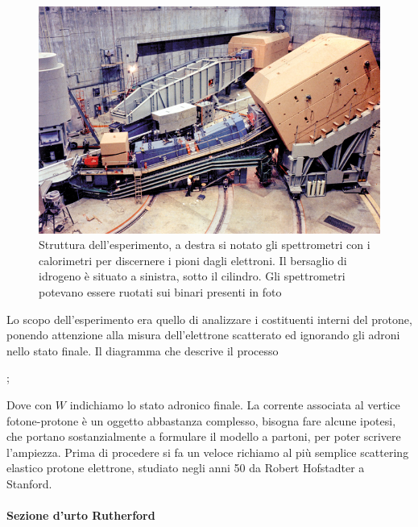 \begin{figure}[hbtp]
\centering
\includegraphics[scale=0.5]{CCsla3_09_12.jpg}
\caption{Struttura dell'esperimento, a destra si notato gli spettrometri con i calorimetri per discernere i pioni dagli elettroni. Il bersaglio di idrogeno è situato a sinistra, sotto il cilindro. Gli spettrometri potevano essere ruotati sui binari presenti in foto }
\end{figure}

Lo scopo dell'esperimento era quello di analizzare i costituenti interni del protone, ponendo attenzione alla misura dell'elettrone scatterato ed ignorando gli adroni nello stato finale. Il diagramma che descrive il processo 
\begin{center}

;
\end{center}

Dove con $W$ indichiamo lo stato adronico finale. La corrente associata al vertice fotone-protone è un oggetto abbastanza complesso, bisogna fare alcune ipotesi, che portano sostanzialmente a formulare il modello a partoni, per poter scrivere l'ampiezza. Prima di procedere si fa un veloce richiamo al più semplice scattering elastico protone elettrone, studiato negli anni 50 da Robert Hofstadter a Stanford.

\paragraph{Sezione d'urto Rutherford}

